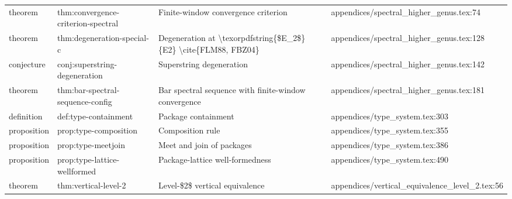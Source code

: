 \documentclass[11pt]{article}
\begin{document}
\begin{longtable}{L{0.10\textwidth}L{0.26\textwidth}L{0.42\textwidth}L{0.22\textwidth}}
theorem & thm:convergence-criterion-spectral & Finite-window convergence criterion & appendices/spectral\_higher\_genus.tex:74\\
theorem & thm:degeneration-special-c & Degeneration at \textbackslash{}texorpdfstring\{\$E\_2\$\}\{E2\} \textbackslash{}cite\{FLM88, FBZ04\} & appendices/spectral\_higher\_genus.tex:128\\
conjecture & conj:superstring-degeneration & Superstring degeneration & appendices/spectral\_higher\_genus.tex:142\\
theorem & thm:bar-spectral-sequence-config & Bar spectral sequence with finite-window convergence & appendices/spectral\_higher\_genus.tex:181\\
definition & def:type-containment & Package containment & appendices/type\_system.tex:303\\
proposition & prop:type-composition & Composition rule & appendices/type\_system.tex:355\\
proposition & prop:type-meetjoin & Meet and join of packages & appendices/type\_system.tex:386\\
proposition & prop:type-lattice-wellformed & Package-lattice well-formedness & appendices/type\_system.tex:490\\
theorem & thm:vertical-level-2 & Level-\$2\$ vertical equivalence & appendices/vertical\_equivalence\_level\_2.tex:56\\

\end{longtable}
\end{document}
